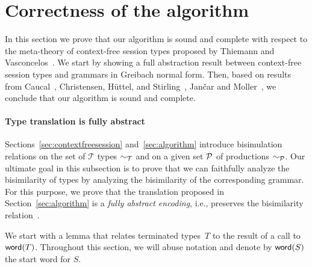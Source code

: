 \section{Correctness of the algorithm}
\label{sec:correctness}

In this section we prove that our algorithm is sound and complete
with respect to the meta-theory of context-free session types proposed
by Thiemann and Vasconcelos~\cite{thiemann2016context}.
%
We start by showing a full abstraction result between context-free
session types and grammars in Greibach normal form.
%
Then, based on results from Caucal~\cite{caucal1986decidabilite},
Christensen, H{\"{u}}ttel, and
Stirling~\cite{DBLP:journals/iandc/ChristensenHS95}, Jan{\v{c}}ar and
Moller~\cite{janvcar1999techniques}, we conclude that our algorithm is
sound and complete.

\paragraph{Type translation is fully abstract}

Sections~\ref{sec:contextfreesession} and~\ref{sec:algorithm}
introduce bisimulation relations on the set of $\mathcal T$ types
$\sim_\mathcal T$ and on a given set $\mathcal P$ of productions
$\sim_\mathcal P$.  Our ultimate goal in this subsection is to prove that
we can faithfully analyze the bisimilarity of types by analyzing the
bisimilarity of the corresponding grammar. For this purpose, we prove
that the translation proposed in Section~\ref{sec:algorithm} is a
\emph{fully abstract encoding}, i.e., preserves the bisimilarity
relation~\cite{gorla2016full}.


We start with a lemma that relates terminated types~$T$ to the result 
of a call to $\mathsf{word}(T)$. Throughout this section, we 
will abuse notation and denote by $\mathsf{word}(S)$ the start word for $S$.

